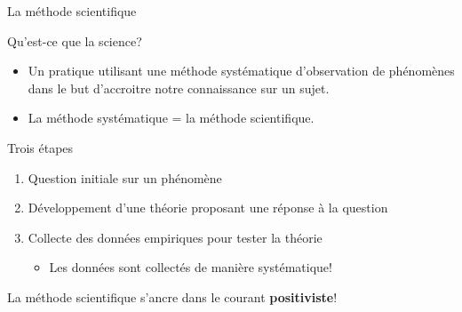 \documentclass[10pt]{beamer}
\begin{document}
\begin{frame}{La méthode scientifique}
     {
        \begin{block}{Qu'est-ce que la science?}
            \begin{itemize}
                \item <2-> Un pratique utilisant une méthode systématique d'observation de phénomènes dans le but d'accroitre notre connaissance sur un sujet.
                \item <3-> La méthode systématique = la méthode scientifique.
            \end{itemize}
        \end{block}
    }
     {
        \begin{block}{Trois étapes}
            \begin{enumerate}
                \item <5-> Question initiale sur un phénomène
                \item <5-> Développement d'une théorie proposant une réponse à la question
                \item <5-> Collecte des données empiriques pour tester la théorie
                    \begin{itemize}
                        \item Les données sont collectés de manière systématique!
                    \end{itemize}
            \end{enumerate}
        \end{block}
    }
     La méthode scientifique s'ancre dans le courant \textbf{positiviste}!
\end{frame}
\end{document}
